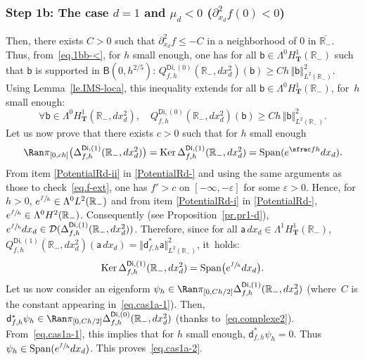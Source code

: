 \documentclass[JEP,XML,SOM,Unicode,NoEqCountersInSection,NoFloatCountersInSection,published]{cedram}
\DeclareMathOperator{\Span}{Span}
\newcommand{\mbf}[1]{\mathbf{#1}}
\let\ve\varepsilon
\DeclareMathOperator\Ker{Ker}
\theoremstyle{plain}
\theoremstyle{definition}
\begin{document}
\subsubsection*{Step 1b: The case $d=1$ and $\mu_{d}<0$ (\ie $ \partial_{x_d}^2 f(0)<0$)}
Then, there exists $C>0$ such that $\partial_{x_d}^2 f\le -C$ in a neighborhood of $0$ in $\overline{\mathbb R_-}$. Thus, from~\eqref{eq.1bb-<}, for $h$ small enough, one has for all $\mathsf b\in \Lambda^0 H^1_{\mbf T}(\mathbb R_-)$ such that $\mathsf b$ is supported in $\mathsf B(0,h^{2/5 })$: $
Q_{f,h}^{\mathsf{Di},(0)}(\mathbb R_-, dx_d^2)(\mathsf b)\ge C h\, \Vert \mathsf b \Vert_{L^2(\mathbb R_-)}^2$.
Using Lemma~\ref{le.IMS-loca}, this inequality extends for all $\mathsf b\in \Lambda^0 H^1_{\mbf T}(\mathbb R_-)$, \ie for~$h$ small enough:
\begin{equation}\label{eq.cas1a-1}
\forall \mathsf b\in \Lambda^0 H^1_{\mbf T}(\mathbb R_-, dx_d^2),\quad Q_{f,h}^{\mathsf{Di},(0)}(\mathbb R_-, dx_d^2)(\mathsf b)\ge Ch\, \Vert \mathsf b \Vert_{L^2(\mathbb R_-)}^2.
\end{equation}
Let us now prove that there exists $c>0$ such that for $h$ small enough
\begin{equation}\label{eq.cas1a-2}
\Ran \pi_{[0,ch]}\bigl(\Delta_{f,h}^{\mathsf{Di},(1)}(\mathbb R_-, dx_d^2)\bigr)=\Ker \Delta_{f,h}^{\mathsf{Di},(1)}(\mathbb R_-, dx_d^2) = \Span (e^{\sfrac fh}dx_d).
\end{equation}
From item \eqref{PotentialRd-ii} in \ref{PotentialRd-} and using the same
arguments as those to check~\eqref{eq.f-ext}, one has $f'>c$ on $[-\infty, -\ve]$ for some $\ve>0$. Hence, for $h>0$, $e^{\sfrac fh}\in \Lambda^0L^2(\mathbb R_-)$ and from item \eqref{PotentialRd-i} in \ref{PotentialRd-}, $e^{\sfrac fh}\in \Lambda^0H^2(\mathbb R_-)$. Consequently (see Proposition~\ref{pr.pr1-d}), $e^{\sfrac fh}dx_d\in \mathcal D(\Delta_{f,h}^{\mathsf{Di},(1)}(\mathbb R_-, dx_d^2))$.
Therefore, since for all $\mathsf a \, dx_d\in \Lambda^1 H^1_{\mbf T}(\mathbb R_-)$, $Q_{f,h}^{\mathsf{Di},(1)}(\mathbb R_-, dx_d^2)(\mathsf a \, dx_d)= \Vert \mathsf d^*_{f,h} \mathsf a \Vert_{L^2(\mathbb R_-)}^2$, it~holds:
\[
\Ker \Delta_{f,h}^{\mathsf{Di},(1)}(\mathbb R_-,dx_d^2) = \Span \bigl(e^{\sfrac fh}dx_d\bigr).
\]
Let us now consider an eigenform $\psi_h\in \Ran \pi_{[0,Ch/2]}
\Delta_{f,h}^{\mathsf{Di},(1)}(\mathbb R _-,dx_d^2) $ (where~$C$
is the constant appearing in~\eqref{eq.cas1a-1}). Then, $\mathsf
d_{f,h}^* \psi_h \in \Ran \pi_{[0,Ch/2]}
\Delta_{f,h}^{\mathsf{Di},(0)}(\mathbb R_-,dx_d^2) $ (thanks
to~\eqref{eq.complexe2}). From~\eqref{eq.cas1a-1}, this implies that
for $h$ small enough, $\mathsf d^*_{f,h} \psi_h=0$. Thus $\psi_h\in
\Span (e^{\sfrac fh} dx_d)$. This proves~\eqref{eq.cas1a-2}.
\end{document}
